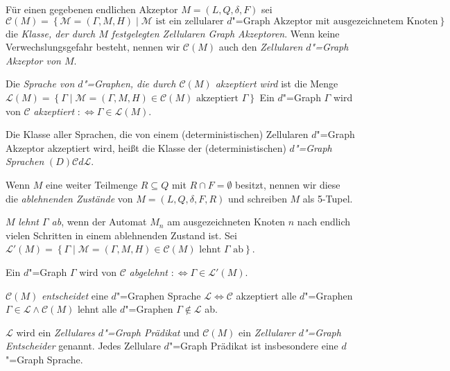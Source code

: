 \documentclass[11pt]{article}
\newcommand{\defWord}[1]{\emph{#1}}
\begin{document}
\begin{definition}[Sprachen]
	Für einen gegebenen endlichen Akzeptor $M = \left(L, Q, \delta, F\right)$ sei $\mathcal{C} \left(M\right) = \left\{\mathcal{M} = \left(\Gamma, M, H\right) \mid \mathcal{M} \text{ ist ein zellularer $d$"=Graph Akzeptor mit ausgezeichnetem Knoten} \right\}$  die \defWord{Klasse, der durch $M$ festgelegten Zellularen Graph Akzeptoren}. 
	Wenn keine Verwechslungsgefahr besteht, nennen wir $\mathcal{C}\left(M\right)$ auch den \defWord{Zellularen $d$"=Graph Akzeptor von $M$}.
	
	Die \defWord{Sprache von $d$"=Graphen, die durch $\mathcal{C}\left(M\right)$ akzeptiert wird} ist die Menge $\mathcal{L}\left(M\right) = \left\{\Gamma \mid \mathcal{M} = \left(\Gamma, M, H\right) \in \mathcal{C}\left(M\right) \text{ akzeptiert } \Gamma \right\}$
	Ein $d$"=Graph $\Gamma$ wird von $\mathcal{C}$ \defWord{akzeptiert} $:\iff \Gamma \in \mathcal{L}\left(M\right)$.
	
	Die Klasse aller Sprachen, die von einem (deterministischen) Zellularen $d$"=Graph Akzeptor akzeptiert wird, heißt die Klasse der (deterministischen) \defWord{$d$"=Graph Sprachen} $(D)\mathcal{C}d\mathcal{L}$. 
\end{definition}

\begin{definition}[$d$"=Graph Entscheider]
	Wenn $M$ eine weiter Teilmenge $R \subseteq Q$ mit $R \cap F = \emptyset$ besitzt, nennen wir diese die \defWord{ablehnenden Zustände} von $M = \left(L, Q, \delta, F, R\right)$ und schreiben $M$ als 5-Tupel.
	
	$M$ \defWord{lehnt $\Gamma$ ab}, wenn der Automat $M_n$ am ausgezeichneten Knoten $n$ nach endlich vielen Schritten in einem ablehnenden Zustand ist.
	Sei  $\mathcal{L}'\left(M\right) = \left\{\Gamma \mid \mathcal{M} = \left(\Gamma, M, H\right) \in \mathcal{C}\left(M\right) \text{ lehnt } \Gamma \text{ ab}\right\}$.
	
	Ein $d$"=Graph $\Gamma$ wird von $\mathcal{C}$ \defWord{abgelehnt} $:\iff \Gamma \in \mathcal{L}'\left(M\right)$.
	
	$\mathcal{C}\left(M\right)$ \defWord{entscheidet} eine $d$"=Graphen Sprache $\mathcal{L} \iff \mathcal{C}$ akzeptiert alle $d$"=Graphen $\Gamma \in \mathcal{L} \land \mathcal{C}\left(M\right)$ lehnt alle $d$"=Graphen $\Gamma \notin \mathcal{L}$ ab.
	
	$\mathcal{L}$ wird ein \defWord{Zellulares $d$"=Graph Prädikat} und $\mathcal{C}\left(M\right)$ ein \defWord{Zellularer $d$"=Graph Entscheider} genannt. 
	Jedes Zellulare $d$"=Graph Prädikat ist insbesondere eine $d$"=Graph Sprache.
\end{definition}
\end{document}
